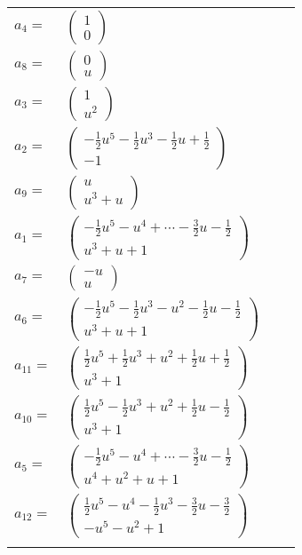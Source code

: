 \documentclass[1p]{elsarticle_modified}
\theoremstyle{definition}
\begin{document}
\begin{tabular}{m{7pt} m{180pt} m{7pt} m{180pt} }
\flushright $a_{4}=$&$\begin{pmatrix}1\\0\end{pmatrix}$ \\
\flushright $a_{8}=$&$\begin{pmatrix}0\\u\end{pmatrix}$ \\
\flushright $a_{3}=$&$\begin{pmatrix}1\\u^2\end{pmatrix}$ \\
\flushright $a_{2}=$&$\begin{pmatrix}-\frac{1}{2} u^5-\frac{1}{2} u^3-\frac{1}{2} u+\frac{1}{2}\\-1\end{pmatrix}$ \\
\flushright $a_{9}=$&$\begin{pmatrix}u\\u^3+u\end{pmatrix}$ \\
\flushright $a_{1}=$&$\begin{pmatrix}-\frac{1}{2} u^5- u^4+\cdots-\frac{3}{2} u-\frac{1}{2}\\u^3+u+1\end{pmatrix}$ \\
\flushright $a_{7}=$&$\begin{pmatrix}- u\\u\end{pmatrix}$ \\
\flushright $a_{6}=$&$\begin{pmatrix}-\frac{1}{2} u^5-\frac{1}{2} u^3- u^2-\frac{1}{2} u-\frac{1}{2}\\u^3+u+1\end{pmatrix}$ \\
\flushright $a_{11}=$&$\begin{pmatrix}\frac{1}{2} u^5+\frac{1}{2} u^3+u^2+\frac{1}{2} u+\frac{1}{2}\\u^3+1\end{pmatrix}$ \\
\flushright $a_{10}=$&$\begin{pmatrix}\frac{1}{2} u^5-\frac{1}{2} u^3+u^2+\frac{1}{2} u-\frac{1}{2}\\u^3+1\end{pmatrix}$ \\
\flushright $a_{5}=$&$\begin{pmatrix}-\frac{1}{2} u^5- u^4+\cdots-\frac{3}{2} u-\frac{1}{2}\\u^4+u^2+u+1\end{pmatrix}$ \\
\flushright $a_{12}=$&$\begin{pmatrix}\frac{1}{2} u^5- u^4-\frac{1}{2} u^3-\frac{3}{2} u-\frac{3}{2}\\- u^5- u^2+1\end{pmatrix}$\\&\end{tabular}
\end{document}
